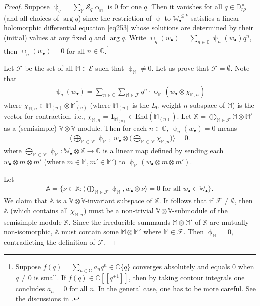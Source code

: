 \documentclass[12pt,a4paper,notitlepage]{article}
\theoremstyle{definition}
\theoremstyle{plain}
\newcommand{\mc}{\mathcal}
\newcommand{\End}{\mathrm{End}} %
\newcommand{\id}{\mathbf{1}}
\newcommand{\bigbk}[1]{\big\langle {#1}\big\rangle}
\newcommand{\Bigbk}[1]{\Big\langle {#1}\Big\rangle}
\newcommand{\blt}{\bullet}
\newcommand{\Vbb}{\mathbb V}
\newcommand{\Xbb}{\mathbb X}
\newcommand{\Abb}{\mathbb A}
\newcommand{\Wbb}{\mathbb W}
\newcommand{\Mbb}{\mathbb M}
\newcommand{\Cbb}{\mathbb C}
\newcommand{\Dbb}{\mathbb D}
\numberwithin{equation}{section}
\begin{document}
\begin{proof}
Suppose $\uppsi_q=\sum_\Mbb\mc S_q\upphi_\Mbb$ is $0$ for one $q$. Then it vanishes for all $q\in\Dbb_{r\rho}^\times$ (and all choices of $\arg q$) since the restriction of $\uppsi$ to $\Wbb_\blt^{\leq k}$ satisfies a linear holomorphic differential equation \eqref{eq253} whose solutions are determined by their (initial) values at any fixed $q$ and $\arg q$. Write $\uppsi_q(w_\blt)=\sum_{n\in\Cbb}\uppsi_n(w_\blt)q^n$, then $\uppsi_n(w_\blt)=0$ for all $n\in\Cbb$.\footnote{Suppose $f(q)=\sum_{n\in\Cbb}a_nq^n\in\Cbb\{q\}$ converges absolutely and equals $0$ when $q\neq 0$ is small. If $f(q)\in\Cbb[[q^{\pm1}]]$, then by taking contour integrals one concludes $a_n=0$ for all $n$. In the general case, one has to be more careful. See the discussions in \cite[Sec. 4.4]{Gui}.}

Let $\mc F$ be the set of all $\Mbb\in\mc E$ such that $\upphi_\Mbb\neq0$. Let us prove that $\mc F=\emptyset$. Note that
\begin{align*}
\uppsi_q(w_\blt)=\sum_{n\in\Cbb}\sum_{\Mbb\in\mc F}q^n\cdot \upphi_\Mbb(w_\blt\otimes \chi_{\Mbb,n})
\end{align*}
where $\chi_{\Mbb,n}\in\Mbb_{(n)}\otimes\Mbb_{(n)}^*$ (where $\Mbb_{(n)}$ is the $L_0$-weight $n$ subspace of $\Mbb$) is the vector for contraction, i.e., $\chi_{\Mbb,n}=\id_{\Mbb_{(n)}}\in\End(\Mbb_{(n)})$. Let $\Xbb=\bigoplus_{\Mbb\in\mc F}\Mbb\otimes\Mbb'$ as a (semisimple) $\Vbb\otimes\Vbb$-module. Then for each $n\in\Cbb$, $\uppsi_n(w_\blt)=0$ means 
\begin{align*}
\Bigbk{\bigoplus_{\Mbb\in\mc F}\upphi_\Mbb,~w_\blt\otimes \big(\bigoplus_{\Mbb\in\mc F} \chi_{\Mbb,n}\big)}=0.
\end{align*}
where $\bigoplus_{\Mbb\in\mc F}\upphi_\Mbb:\Wbb_\blt\otimes\Xbb\rightarrow\Cbb$ is a linear map defined by sending each $w_\blt\otimes m\otimes m'$ (where $m\in\Mbb,m'\in\Mbb'$) to $\upphi_\Mbb(w_\blt\otimes m\otimes m')$.

Let
\begin{align*}
\Abb=\big\{\nu\in\Xbb:\bigbk{\bigoplus_{\Mbb\in\mc F}\upphi_\Mbb,w_\blt\otimes\nu}=0\text{ for all }w_\blt\in\Wbb_\blt\big\}.
\end{align*}
We claim that $\Abb$ is a $\Vbb\otimes\Vbb$-invariant subspace of $\Xbb$. It follows that if $\mc F\neq\emptyset$, then $\Abb$ (which contains all $\chi_{\Mbb,n}$) must be a non-trivial $\Vbb\otimes\Vbb$-submodule of the semisimple module $\Xbb$. Since the irreducible summands $\Mbb\otimes\Mbb'$ of $\Xbb$ are mutually non-isomorphic,  $\Abb$ must contain some $\Mbb\otimes\Mbb'$ where $\Mbb\in\mc F$. Then $\upphi_\Mbb=0$, contradicting the definition of $\mc F$.


\end{proof}
\end{document}
